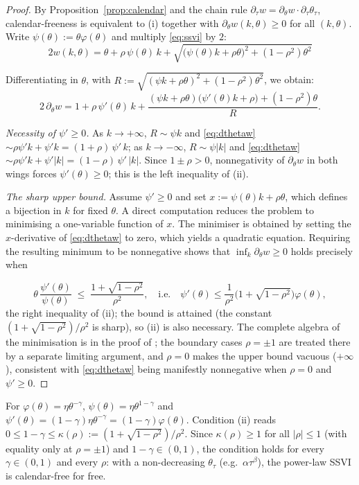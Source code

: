 \begin{proof}
By Proposition~\ref{prop:calendar} and the chain rule
$\partial_\tau w=\partial_\theta w\cdot\partial_\tau\theta_\tau$, calendar-freeness is
equivalent to (i) together with $\partial_\theta w(k,\theta)\ge0$ for all $(k,\theta)$. Write
$\psi(\theta):=\theta\varphi(\theta)$ and multiply \eqref{eq:ssvi} by $2$:
\[
2w(k,\theta)=\theta+\rho\,\psi(\theta)\,k
+\sqrt{\bigl(\psi(\theta)k+\rho\theta\bigr)^2+(1-\rho^2)\theta^2}
\]
 
Differentiating in $\theta$, with
$R:=\sqrt{(\psi k+\rho\theta)^2+(1-\rho^2)\theta^2}$, we obtain:
\begin{equation}\label{eq:dthetaw}
2\,\partial_\theta w
=1+\rho\,\psi'(\theta)\,k
+\frac{(\psi k+\rho\theta)\bigl(\psi'(\theta)k+\rho\bigr)+(1-\rho^2)\theta}{R}.
\end{equation}

\emph{Necessity of $\psi'\ge0$.} As $k\to+\infty$, $R\sim\psi k$ and
\eqref{eq:dthetaw} $\sim\rho\psi'k+\psi'k=(1+\rho)\,\psi'\,k$; as $k\to-\infty$,
$R\sim\psi|k|$ and \eqref{eq:dthetaw} $\sim\rho\psi'k+\psi'|k|=(1-\rho)\,\psi'\,|k|$. Since
$1\pm\rho>0$, nonnegativity of $\partial_\theta w$ in both wings forces $\psi'(\theta)\ge0$;
this is the left inequality of (ii).


\emph{The sharp upper bound.} Assume $\psi'\ge0$ and set
$x:=\psi(\theta)k+\rho\theta$, which defines a bijection in $k$ for fixed $\theta$.
A direct computation reduces the problem to minimising a one-variable function of $x$.
The minimiser is obtained by setting the $x$-derivative of \eqref{eq:dthetaw} to zero,
which yields a quadratic equation. Requiring the resulting minimum to be nonnegative shows
that $\inf_k\partial_\theta w\ge0$ holds precisely when


\[
\theta\,\frac{\psi'(\theta)}{\psi(\theta)}\;\le\;\frac{1+\sqrt{1-\rho^2}}{\rho^2},
\quad\text{i.e.}\quad
\psi'(\theta)\le\frac{1}{\rho^2}\bigl(1+\sqrt{1-\rho^2}\bigr)\varphi(\theta),
\]
the right inequality of (ii); the bound is attained (the constant
$(1+\sqrt{1-\rho^2})/\rho^2$ is sharp), so (ii) is also necessary. The complete algebra of
the minimisation is in the proof of \cite[Thm.~4.1]{gatheraljacquier2014}; the boundary cases
$\rho=\pm1$ are treated there by a separate limiting argument, and $\rho=0$ makes the upper
bound vacuous ($+\infty$), consistent with \eqref{eq:dthetaw} being manifestly nonnegative
when $\rho=0$ and $\psi'\ge0$.
\end{proof}

\begin{example}\label{ex:powerlawcal}
For $\varphi(\theta)=\eta\theta^{-\gamma}$, $\psi(\theta)=\eta\theta^{1-\gamma}$ and
$\psi'(\theta)=(1-\gamma)\eta\theta^{-\gamma}=(1-\gamma)\varphi(\theta)$. Condition (ii) reads
$0\le1-\gamma\le\kappa(\rho):=(1+\sqrt{1-\rho^2})/\rho^2$. Since
$\kappa(\rho)\ge1$ for all $|\rho|\le1$ (with equality only at $\rho=\pm1$) and
$1-\gamma\in(0,1)$, the condition holds for every $\gamma\in(0,1)$ and every $\rho$: with a
non-decreasing $\theta_\tau$ (e.g.\ $\alpha\tau^\beta$), the power-law SSVI is calendar-free
for free.
\end{example}

